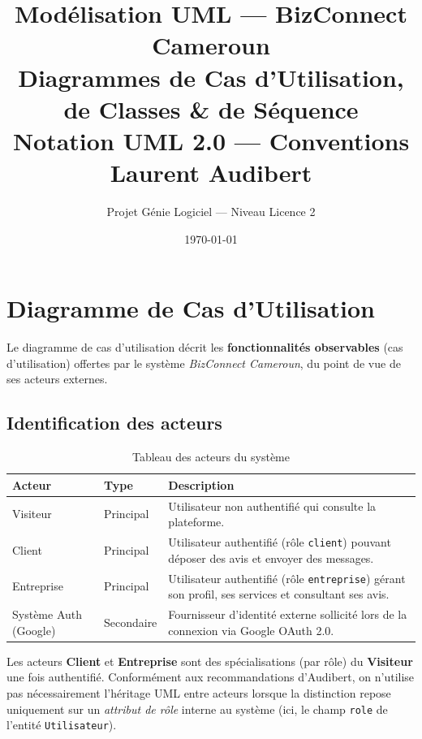 \documentclass[12pt,a4paper]{article}
\title{\textbf{Modélisation UML — BizConnect Cameroun}\\[0.5em]
\large Diagrammes de Cas d'Utilisation, de Classes \& de Séquence\\[0.3em]
\normalsize Notation UML 2.0 — Conventions Laurent Audibert}
\author{Projet Génie Logiciel — Niveau Licence 2}
\date{\today}
\begin{document}
\maketitle
\tableofcontents
\newpage

\section{Diagramme de Cas d'Utilisation}

Le diagramme de cas d'utilisation décrit les \textbf{fonctionnalités observables} (cas d'utilisation) offertes par le système \textit{BizConnect Cameroun}, du point de vue de ses acteurs externes.

\subsection{Identification des acteurs}

\begin{table}[h!]
\centering
\begin{tabular}{llp{8cm}}
\toprule
\textbf{Acteur} & \textbf{Type} & \textbf{Description} \\
\midrule
Visiteur & Principal & Utilisateur non authentifié qui consulte la plateforme. \\
Client & Principal & Utilisateur authentifié (rôle \texttt{client}) pouvant déposer des avis et envoyer des messages. \\
Entreprise & Principal & Utilisateur authentifié (rôle \texttt{entreprise}) gérant son profil, ses services et consultant ses avis. \\
Système Auth (Google) & Secondaire & Fournisseur d'identité externe sollicité lors de la connexion via Google OAuth 2.0. \\
\bottomrule
\end{tabular}
\caption{Tableau des acteurs du système}
\end{table}

\begin{tcolorbox}[colback=blue!3!white,colframe=blue!50!black,title=Note méthodologique (Audibert)]
\small
Les acteurs \textbf{Client} et \textbf{Entreprise} sont des spécialisations (par rôle) du \textbf{Visiteur} une fois authentifié. Conformément aux recommandations d'Audibert, on n'utilise pas nécessairement l'héritage UML entre acteurs lorsque la distinction repose uniquement sur un \textit{attribut de rôle} interne au système (ici, le champ \texttt{role} de l'entité \texttt{Utilisateur}).
\end{tcolorbox}
\end{document}

